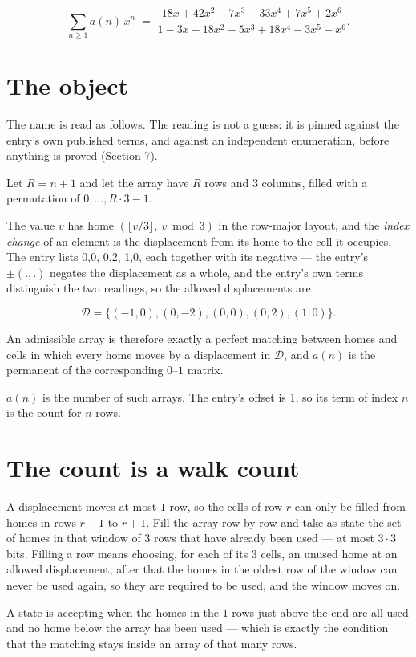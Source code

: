 \documentclass[11pt]{article}
\theoremstyle{definition}
\begin{document}
\[\sum_{n \ge 1} a(n)\,x^n \;=\; \frac{18x + 42x^{2} - 7x^{3} - 33x^{4} + 7x^{5} + 2x^{6}}{1 - 3x - 18x^{2} - 5x^{3} + 18x^{4} - 3x^{5} - x^{6}}.\]

\section{The object}

The name is read as follows. The reading is not a guess: it is pinned against the entry's own published terms, and against an independent enumeration, before anything is proved (Section 7).

Let $R = n + 1$ and let the array have $R$ rows and $3$ columns, filled with a permutation of $0,\dots,R\cdot3-1$.

The value $v$ has home $(\lfloor v/3\rfloor,\ v \bmod 3)$ in the row-major layout, and the {\itshape index change} of an element is the displacement from its home to the cell it occupies. The entry lists 0,0, 0,2, 1,0, each together with its negative --- the entry's $\pm(.,.)$ negates the displacement as a whole, and the entry's own terms distinguish the two readings, so the allowed displacements are

\[\mathcal{D} = \{(-1,0), (0,-2), (0,0), (0,2), (1,0)\}.\]

An admissible array is therefore exactly a perfect matching between homes and cells in which every home moves by a displacement in $\mathcal{D}$, and $a(n)$ is the permanent of the corresponding $0$--$1$ matrix.

$a(n)$ is the number of such arrays. The entry's offset is 1, so its term of index $n$ is the count for $n$ rows.

\section{The count is a walk count}

A displacement moves at most $1$ row, so the cells of row $r$ can only be filled from homes in rows $r-1$ to $r+1$. Fill the array row by row and take as state the set of homes in that window of $3$ rows that have already been used --- at most $3\cdot3$ bits. Filling a row means choosing, for each of its $3$ cells, an unused home at an allowed displacement; after that the homes in the oldest row of the window can never be used again, so they are required to be used, and the window moves on.

A state is accepting when the homes in the $1$ rows just above the end are all used and no home below the array has been used --- which is exactly the condition that the matching stays inside an array of that many rows.
\end{document}
